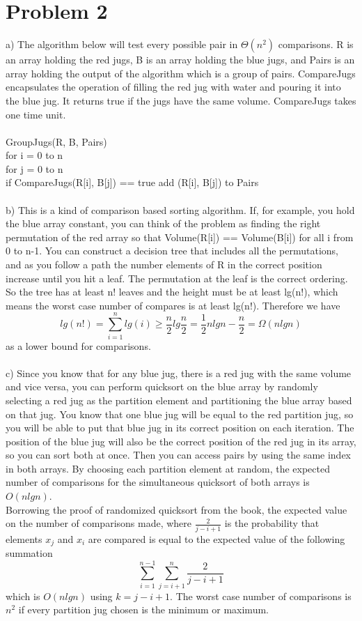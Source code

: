 \documentclass{article}
\begin{document}
\section*{Problem 2}
a) The algorithm below will test every possible pair in $\Theta(n^2)$ comparisons.  R is an array holding the red jugs, B is an array holding the blue jugs, and Pairs is an array holding the output of the algorithm which is a group of pairs.  CompareJugs encapsulates the operation of filling the red jug with water and pouring it into the blue jug.  It returns true if the jugs have the same volume. CompareJugs takes one time unit.\\\\
GroupJugs(R, B, Pairs)\\
\-\hspace{.5cm}for i = 0 to n\\
\-\hspace{1cm}for j = 0 to n\\
\-\hspace{1.5cm}if CompareJugs(R[i], B[j]) == true add (R[i], B[j]) to Pairs\\\\
b) This is a kind of comparison based sorting algorithm. If, for example, you hold the blue array constant, you can think of the problem as finding the right permutation of the red array so that Volume(R[i]) == Volume(B[i]) for all i from 0 to n-1.  You can construct a decision tree that includes all the permutations, and as you follow a path the number elements of R in the correct position increase until you hit a leaf.  The permutation at the leaf is the correct ordering.  So the tree has at least n! leaves and the height must be at least lg(n!), which means the worst case number of compares is at least lg(n!).  Therefore we have $$lg(n!) = \sum_{i=1}^n lg(i) \geq \frac{n}{2}lg\frac{n}{2} = \frac{1}{2}nlgn - \frac{n}{2} = \Omega(nlgn)$$ as a lower bound for comparisons.\\\\
c) Since you know that for any blue jug, there is a red jug with the same volume and vice versa, you can perform quicksort on the blue array by randomly selecting a red jug as the partition element and partitioning the blue array based on that jug.  You know that one blue jug will be equal to the red partition jug, so you will be able to put that blue jug in its correct position on each iteration. The position of the blue jug will also be the correct position of the red jug in its array, so you can sort both at once. Then you can access pairs by using the same index in both arrays. By choosing each partition element at random, the expected number of comparisons for the simultaneous quicksort of both arrays is $O(nlgn)$.\\ Borrowing the proof of randomized quicksort from the book, the expected value on the number of comparisons made, where $\frac{2}{j-i+1}$ is the probability that elements $x_j$ and $x_i$ are compared is equal to the expected value of the following summation $$\sum_{i=1}^{n-1}\sum_{j=i+1}^{n}\frac{2}{j-i+1}$$ which is $O(nlgn)$ using $k=j-i+1$.  The worst case number of comparisons is $n^2$ if every partition jug chosen is the minimum or maximum.
\end{document}
